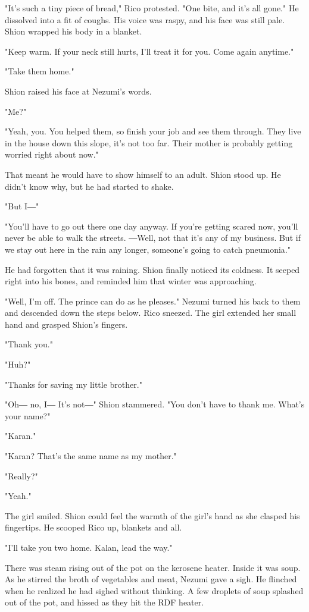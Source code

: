 "It's such a tiny piece of bread," Rico protested. "One bite, and it's
all gone." He dissolved into a fit of coughs. His voice was raspy, and
his face was still pale. Shion wrapped his body in a blanket.

"Keep warm. If your neck still hurts, I'll treat it for you. Come again
anytime."

"Take them home."

Shion raised his face at Nezumi's words.

"Me?"

"Yeah, you. You helped them, so finish your job and see them through.
They live in the house down this slope, it's not too far. Their mother
is probably getting worried right about now."

That meant he would have to show himself to an adult. Shion stood up. He
didn't know why, but he had started to shake.

"But I―"

"You'll have to go out there one day anyway. If you're getting scared
now, you'll never be able to walk the streets. ―Well, not that it's any
of my business. But if we stay out here in the rain any longer,
someone's going to catch pneumonia."

He had forgotten that it was raining. Shion finally noticed its
coldness. It seeped right into his bones, and reminded him that winter
was approaching.

"Well, I'm off. The prince can do as he pleases." Nezumi turned his back
to them and descended down the steps below. Rico sneezed. The girl
extended her small hand and grasped Shion's fingers.

"Thank you."

"Huh?"

"Thanks for saving my little brother."

"Oh― no, I― It's not―" Shion stammered. "You don't have to thank me.
What's your name?"

"Karan."

"Karan? That's the same name as my mother."

"Really?"

"Yeah."

The girl smiled. Shion could feel the warmth of the girl's hand as she
clasped his fingertips. He scooped Rico up, blankets and all.

"I'll take you two home. Kalan, lead the way."

There was steam rising out of the pot on the kerosene heater. Inside it
was soup. As he stirred the broth of vegetables and meat, Nezumi gave a
sigh. He flinched when he realized he had sighed without thinking. A few
droplets of soup splashed out of the pot, and hissed as they hit the RDF
heater.

